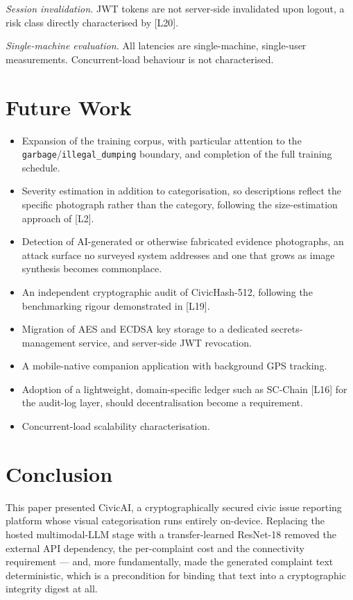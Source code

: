 \documentclass[conference]{IEEEtran}
\begin{document}
\emph{Session invalidation.} JWT tokens are not server-side invalidated upon logout, a risk class directly characterised by [L20].

\emph{Single-machine evaluation.} All latencies are single-machine, single-user measurements. Concurrent-load behaviour is not characterised.

\section{Future Work}
\begin{itemize}
\item Expansion of the training corpus, with particular attention to the \texttt{garbage}/\texttt{illegal\_dumping} boundary, and completion of the full training schedule.
\item Severity estimation in addition to categorisation, so descriptions reflect the specific photograph rather than the category, following the size-estimation approach of [L2].
\item Detection of AI-generated or otherwise fabricated evidence photographs, an attack surface no surveyed system addresses and one that grows as image synthesis becomes commonplace.
\item An independent cryptographic audit of CivicHash-512, following the benchmarking rigour demonstrated in [L19].
\item Migration of AES and ECDSA key storage to a dedicated secrets-management service, and server-side JWT revocation.
\item A mobile-native companion application with background GPS tracking.
\item Adoption of a lightweight, domain-specific ledger such as SC-Chain [L16] for the audit-log layer, should decentralisation become a requirement.
\item Concurrent-load scalability characterisation.
\end{itemize}

\section{Conclusion}
This paper presented CivicAI, a cryptographically secured civic issue reporting platform whose visual categorisation runs entirely on-device. Replacing the hosted multimodal-LLM stage with a transfer-learned ResNet-18 removed the external API dependency, the per-complaint cost and the connectivity requirement --- and, more fundamentally, made the generated complaint text deterministic, which is a precondition for binding that text into a cryptographic integrity digest at all.
\end{document}
